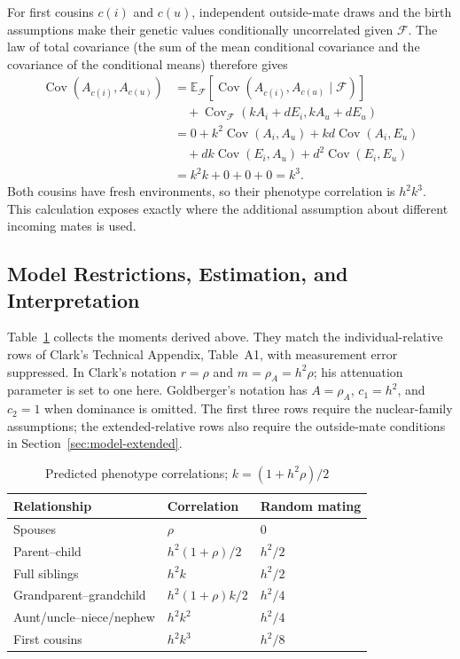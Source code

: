 For first cousins $c(i)$ and $c(u)$, independent outside-mate draws
and the birth assumptions make their genetic values conditionally
uncorrelated given $\mathcal F$. The law of total covariance
(the sum of the mean conditional covariance and the covariance of
the conditional means) therefore gives
\begin{align*}
 \operatorname{Cov}(A_{c(i)},A_{c(u)})
 &=\mathbb E_{\mathcal F}
       [\operatorname{Cov}(A_{c(i)},A_{c(u)}\mid\mathcal F)]\\
 &\quad+\operatorname{Cov}_{\mathcal F}(kA_i+dE_i,kA_u+dE_u)\\
 &=0+k^2\operatorname{Cov}(A_i,A_u)
   +kd\operatorname{Cov}(A_i,E_u)\\
 &\quad+dk\operatorname{Cov}(E_i,A_u)
   +d^2\operatorname{Cov}(E_i,E_u)\\
 &=k^2k+0+0+0=k^3.
\end{align*}
Both cousins have fresh environments, so their phenotype correlation is
$\boxed{h^2k^3}$. This calculation exposes exactly where the additional
assumption about different incoming mates is used.

\subsection{Model Restrictions, Estimation, and Interpretation}
\label{sec:model-tests}

Table~\ref{tab:notation} collects the moments derived above. They
match the individual-relative rows of Clark's Technical Appendix,
Table~A1, with measurement error suppressed. In Clark's notation
$r=\rho$ and $m=\rho_A=h^2\rho$; his attenuation parameter is set to
one here. Goldberger's notation has $A=\rho_A$, $c_1=h^2$, and $c_2=1$
when dominance is omitted. The first three rows require the nuclear-family
assumptions; the extended-relative rows also require the outside-mate
conditions in Section~\ref{sec:model-extended}.
\begin{table}[htbp]
\centering
\caption{Predicted phenotype correlations; $k=(1+h^2\rho)/2$}
\label{tab:notation}
\begin{tabular}{lll}
\hline
Relationship & Correlation & Random mating\\
\hline
Spouses & $\rho$ & $0$\\
Parent--child & $h^2(1+\rho)/2$ & $h^2/2$\\
Full siblings & $h^2k$ & $h^2/2$\\
Grandparent--grandchild & $h^2(1+\rho)k/2$ & $h^2/4$\\
Aunt/uncle--niece/nephew & $h^2k^2$ & $h^2/4$\\
First cousins & $h^2k^3$ & $h^2/8$\\
\hline
\end{tabular}
\end{table}

